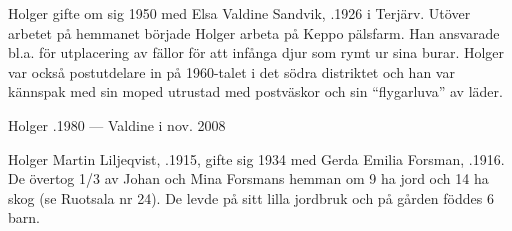 Holger gifte om sig 1950 med Elsa Valdine Sandvik, .1926 i Terjärv. Utöver arbetet på hemmanet började Holger arbeta på Keppo pälsfarm. Han ansvarade bl.a. för utplacering av fällor för att infånga djur som rymt ur sina burar. Holger var också postutdelare in på 1960-talet i det södra distriktet och han var kännspak med sin moped utrustad med postväskor och sin ``flygarluva'' av läder.
\begin{jhchildren}
  \item {}
  \item {}
  \item {}
  \item {}
  \item {}
  \item {}
\end{jhchildren}

Holger .1980  ---  Valdine \textdied i nov. 2008


Holger Martin Liljeqvist, .1915, gifte sig 1934 med Gerda Emilia Forsman, .1916. De övertog 1/3 av Johan och Mina Forsmans hemman om 9 ha jord och 14 ha skog (se Ruotsala nr 24). De levde på sitt lilla jordbruk och på gården föddes 6 barn.
\begin{jhchildren}
  \item {}
  \item {}
  \item {}
  \item {}
  \item {}
  \item {}
\end{jhchildren}

